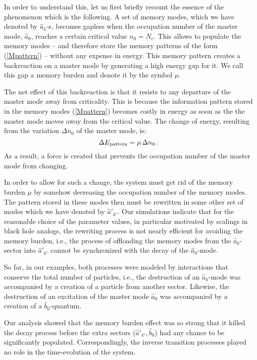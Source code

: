 \documentclass[aps,prd,reprint,superscriptaddress,nofootinbib]{revtex4-2}
\newcommand*{\ie}{i.e., }
\begin{document}
In order to understand this, let us first briefly recount the essence of the phenomenon which is the following.  A set of memory modes, which we have denoted by 
$\hat{a}_k$-s, becomes gapless when the occupation number of 
the master mode, $\hat{a}_0$, reaches a certain critical value 
$n_0 = N_c$. This allows to populate the memory modes -- and 
therefore store the memory patterns of the form (\ref{Mpattern}) --  
without any expense in energy.  
This memory pattern creates a backreaction on  
a master mode by generating a high
energy gap for it.  We call this gap a memory burden  and denote 
it by the symbol $\mu$. 


The net effect of this backreaction is that it resists to any departure of 
the master mode away from criticality. This is because the information 
pattern stored in the memory modes (\ref{Mpattern})
becomes costly in energy
as soon as the the master mode moves away from the critical value. 
The change of energy, resulting from the variation $\Delta n_0$ of the master mode, is: 
\begin{equation} \label{Pcost} 
\Delta E_{\rm pattern} =  \mu \, \Delta n_0 \, .
\end{equation} 
As a result, a force is created that prevents the occupation number of 
the master mode from changing. 


In order to allow for such a change, the system must get rid of the 
memory burden $\mu$ by somehow decreasing the occupation number of the memory modes.  The pattern stored in these modes then must be rewritten 
in some other set of modes which we have denoted by $\hat{a}'_{k'}$.  
Our simulations indicate that for the reasonable choice of the parameter values, in particular motivated by scalings in black hole analogs,  
the rewriting process is not nearly efficient for avoiding the memory burden, \ie the process of offloading the 
memory modes from the $\hat{a}_k$-sector into $\hat{a}'_{k'}$ 
cannot be synchronized with the decay of the 
$\hat{a}_0$-mode.  

So far, in our examples, both processes were modeled by interactions that 
conserve the
total number of particles, \ie the destruction of an $\hat{a}_k$-mode 
was accompanied by a creation of a particle from another sector. 
Likewise, the destruction of an excitation of the master mode $\hat{a}_0$ 
was 
accompanied by a creation of a $\hat{b}_0$-quantum. 

Our analysis showed that the memory burden effect was so strong that it 
killed the decay process  before 
the extra sectors ($\hat{a}'_{k'}, \hat{b}_0$) 
had any chance to be significantly populated. 
Correspondingly, the inverse transition processes played no role
in the time-evolution of the system.  
\end{document}
